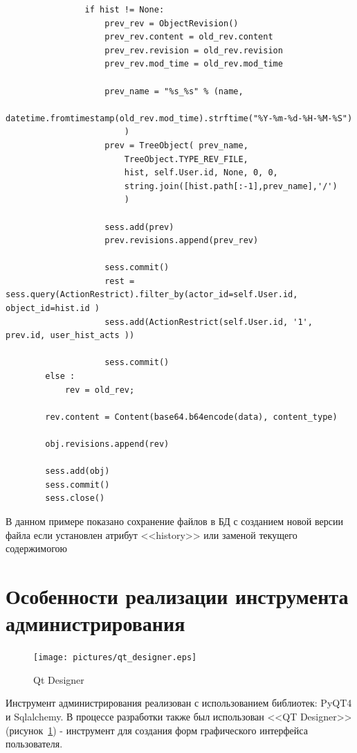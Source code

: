 \documentclass[utf8,usehyperref,12pt]{G7-32}
\begin{document}
\begin{verbatim}
                if hist != None:
                    prev_rev = ObjectRevision()
                    prev_rev.content = old_rev.content
                    prev_rev.revision = old_rev.revision
                    prev_rev.mod_time = old_rev.mod_time
                    
                    prev_name = "%s_%s" % (name, 
                    	datetime.fromtimestamp(old_rev.mod_time).strftime("%Y-%m-%d-%H-%M-%S")
                    	)    
                    prev = TreeObject( prev_name,
	                    TreeObject.TYPE_REV_FILE,
    	                hist, self.User.id, None, 0, 0,
	                    string.join([hist.path[:-1],prev_name],'/')
                    	)
                    
                    sess.add(prev)
                    prev.revisions.append(prev_rev)                
                    
                    sess.commit() 
                    rest = sess.query(ActionRestrict).filter_by(actor_id=self.User.id, object_id=hist.id )       
                    sess.add(ActionRestrict(self.User.id, '1', prev.id, user_hist_acts ))
                    
                    sess.commit()
        else :
            rev = old_rev;           
            
        rev.content = Content(base64.b64encode(data), content_type) 
        
        obj.revisions.append(rev)                
        
        sess.add(obj)        
        sess.commit()
        sess.close()
\end{verbatim}

В данном примере показано сохранение файлов в БД с созданием новой версии файла если установлен атрибут <<history>> или заменой текущего содержимогою

\section{Особенности реализации инструмента администрирования}

\begin{figure}[hb!]
   \centering%
   \texttt{[image: pictures/qt\_designer.eps]}
   \caption{Qt Designer}\label{fig:qt_designer}
\end{figure}

Инструмент администрирования реализован с использованием библиотек: PyQT4 и Sqlalchemy. В процессе разработки также был использован <<QT Designer>>(рисунок~\ref{fig:qt_designer}) - инструмент для создания форм графического интерфейса пользователя.
\end{document}
